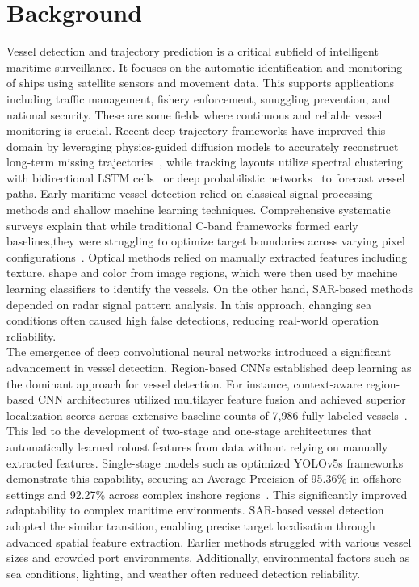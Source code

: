 \section{Background} 
Vessel detection and trajectory prediction is a critical subfield of intelligent maritime surveillance. It focuses on the automatic identification and monitoring of
ships using satellite sensors and movement data. This supports applications including traffic management, fishery enforcement, smuggling prevention, and national
security. These are some fields where continuous and reliable vessel monitoring is
crucial. Recent deep trajectory frameworks have improved  this domain by leveraging physics-guided diffusion models to accurately reconstruct long-term missing trajectories~\cite{10.1145/3637528.3672086}, while tracking layouts utilize spectral clustering with bidirectional LSTM cells~\cite{jmse9091037} or deep probabilistic networks~\cite{s22052058} to forecast vessel paths. Early maritime vessel detection relied on classical signal processing methods
and shallow machine learning techniques. Comprehensive systematic surveys explain that while traditional C-band frameworks formed early baselines,they were struggling to optimize target boundaries across varying pixel configurations~\cite{10620443, jmse9121408}. Optical methods relied on manually extracted features including texture, shape and color from image regions, which were
then used by machine learning classifiers to identify the vessels. On the other hand,
SAR-based methods depended on radar signal pattern analysis. In this approach,
changing sea conditions often caused high false detections, reducing real-world operation reliability. \\


The emergence of deep convolutional neural networks introduced a significant advancement in vessel detection. Region-based CNNs established deep learning as the
dominant approach for vessel detection. For instance, context-aware region-based CNN architectures utilized multilayer feature fusion and achieved superior localization scores across extensive baseline counts of 7,986 fully labeled vessels~\cite{rs9080860}. This led to the development of two-stage
and one-stage architectures that automatically learned robust features from data
without relying on manually extracted features. Single-stage models such as optimized YOLOv5s frameworks demonstrate this capability, securing an Average Precision of 95.36\% in offshore settings and 92.27\% across complex inshore regions~\cite{10.3389/fmars.2022.1086140}. This significantly improved adaptability to complex maritime environments. SAR-based vessel detection adopted the similar transition, enabling precise target localisation through advanced spatial feature extraction. Earlier methods struggled with various vessel sizes and crowded port environments. Additionally, environmental factors such as sea conditions, lighting, and weather often reduced detection reliability. \\


